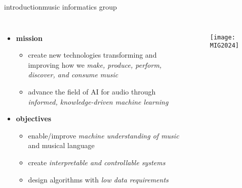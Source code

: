 \begin{frame}{introduction}{music informatics group}
    \begin{columns}
    \begin{itemize}
        \item   \textbf{mission}
            \begin{itemize}
                \item   create new technologies transforming and improving how we \textit{make, produce, perform, discover, and consume music}
                \item   advance the field of AI for audio through \textit{informed, knowledge-driven machine learning}
            \end{itemize}
        \bigskip
        \item   \textbf{objectives}
            \begin{itemize}
                \item   enable/improve \textit{machine understanding of music} and musical language
                \item   create \textit{interpretable and controllable systems}
                \item   design algorithms with \textit{low data requirements}
            \end{itemize}
    \end{itemize}
        \vspace{12mm}\begin{figure}%
            \texttt{[image: MIG2024]}%
        \end{figure}
    \end{columns}
\end{frame}
